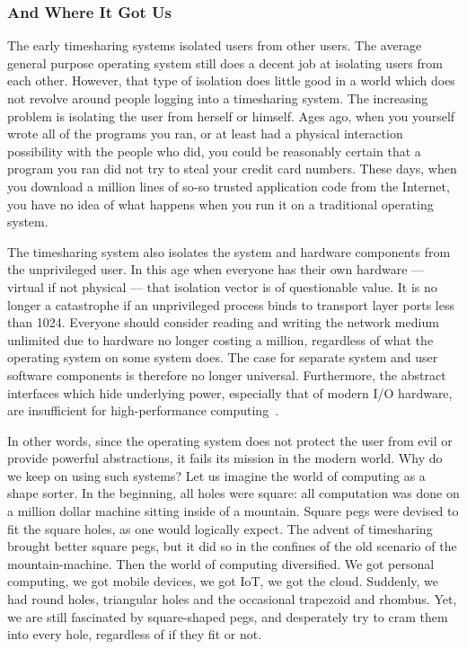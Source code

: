 \subsubsection{And Where It Got Us}

The early timesharing systems isolated users from other users.
The average general purpose operating system still does a decent job at
isolating users from each other.  However, that type of isolation does
little good in a world which does not revolve around people logging
into a timesharing system.  The increasing problem is
isolating the user from herself or himself.  Ages ago, when you yourself
wrote all of the programs you ran, or at least had a physical interaction
possibility with the people who did, you could be reasonably certain
that a program you ran did not try to steal your credit card numbers.
These days, when you download a million lines of so-so trusted application
code from the Internet, you have no idea of what happens when you run
it on a traditional operating system.

The timesharing system also isolates the system and hardware components
from the unprivileged user.  In this age when everyone has their own
hardware --- virtual if not physical --- that isolation vector is of
questionable value.  It is no longer a catastrophe if an unprivileged
process binds to transport layer ports less than 1024.  Everyone should
consider reading and writing the network medium unlimited due to
hardware no longer costing a million, regardless of what the operating
system on some system does.  The case for separate system and user
software components is therefore no longer universal.  Furthermore,
the abstract interfaces which hide underlying power, especially that of
modern I/O hardware, are insufficient for high-performance
computing~\cite{peter:arrakis}.

In other words, since the operating system does not protect the user
from evil or provide powerful abstractions, it fails its mission
in the modern world.  Why do we keep on using such systems?  Let us
imagine the world of computing as a shape sorter.  In the beginning,
all holes were square: all computation was done on a million dollar
machine sitting inside of a mountain.  Square pegs were devised to fit
the square holes, as one would logically expect.  The advent of timesharing brought better square pegs, but
it did so in the confines of the old scenario of the mountain-machine.
Then the world of computing diversified.  We got personal computing,
we got mobile devices, we got IoT, we got the cloud.  Suddenly, we had
round holes, triangular holes and the occasional trapezoid and rhombus.
Yet, we are still fascinated by square-shaped pegs, and desperately try
to cram them into every hole, regardless of if they fit or not.

